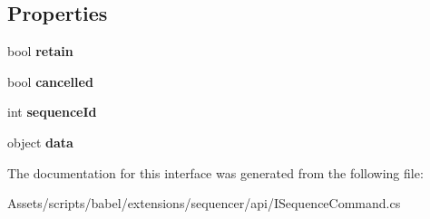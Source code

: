 \subsection*{Properties}
\begin{DoxyCompactItemize}
\item 
\hypertarget{interfacebabel_1_1extensions_1_1sequencer_1_1api_1_1_i_sequence_command_a4277474bc0c20eb3a7b528e2ea6cffb8}{bool {\bfseries retain}}\label{interfacebabel_1_1extensions_1_1sequencer_1_1api_1_1_i_sequence_command_a4277474bc0c20eb3a7b528e2ea6cffb8}

\item 
\hypertarget{interfacebabel_1_1extensions_1_1sequencer_1_1api_1_1_i_sequence_command_a0117e25748568438d3239be4e2e79d91}{bool {\bfseries cancelled}}\label{interfacebabel_1_1extensions_1_1sequencer_1_1api_1_1_i_sequence_command_a0117e25748568438d3239be4e2e79d91}

\item 
\hypertarget{interfacebabel_1_1extensions_1_1sequencer_1_1api_1_1_i_sequence_command_aefcac10cb9eccf7a0802ab8d6416a88f}{int {\bfseries sequence\-Id}}\label{interfacebabel_1_1extensions_1_1sequencer_1_1api_1_1_i_sequence_command_aefcac10cb9eccf7a0802ab8d6416a88f}

\item 
\hypertarget{interfacebabel_1_1extensions_1_1sequencer_1_1api_1_1_i_sequence_command_aa70da82f83adc15f40ab24a4e4f408cf}{object {\bfseries data}}\label{interfacebabel_1_1extensions_1_1sequencer_1_1api_1_1_i_sequence_command_aa70da82f83adc15f40ab24a4e4f408cf}

\end{DoxyCompactItemize}


The documentation for this interface was generated from the following file\-:\begin{DoxyCompactItemize}
\item 
Assets/scripts/babel/extensions/sequencer/api/I\-Sequence\-Command.\-cs\end{DoxyCompactItemize}
